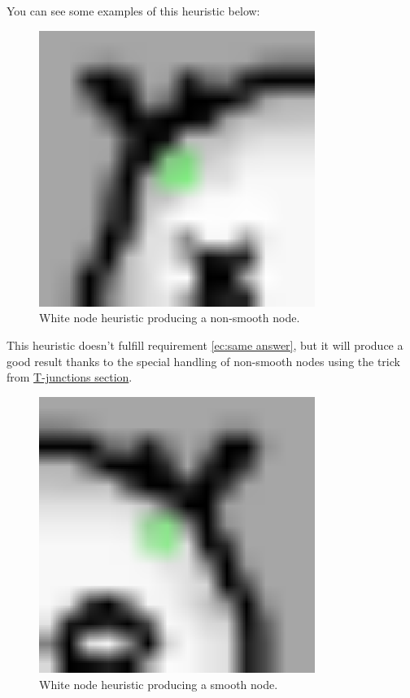 You can see some examples of this heuristic below:

\begin{figure}[H]
  \centering
  \includegraphics[width=0.8\textwidth]{assets/boof_white2.pdf}
  \caption{White node heuristic producing a non-smooth node.}
\end{figure}

This heuristic doesn't fulfill requirement \ref{ec:same answer}, but it will
produce a good result thanks to the special handling of non-smooth nodes using
the trick from \hyperref[tjunction]{T-junctions section}.

\begin{figure}[H]
  \centering
  \includegraphics[width=0.8\textwidth]{assets/boof_white3.pdf}
  \caption{White node heuristic producing a smooth node.}
\end{figure}

